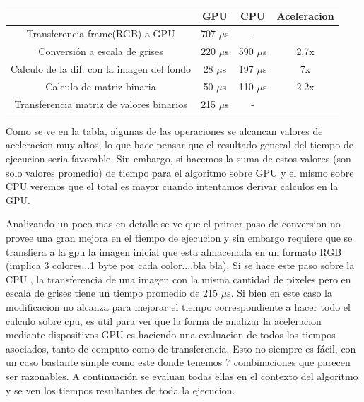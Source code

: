 \documentclass[a4paper,10pt]{report}
\begin{document}
\begin{center}
    \begin{tabular}{ c | c | c | c }
    \hline
    & GPU & CPU & Aceleracion\\ \hline
    Transferencia frame(RGB) a GPU & 707 $\mu$s &  - \\ \hline
    Conversión a escala de grises & 220 $\mu$s & 590 $\mu$s & 2.7x \\ \hline
    Calculo de la dif. con la imagen del fondo & 28 $\mu$s & 197 $\mu$s & 7x\\ \hline
    Calculo de matriz binaria & 50 $\mu$s & 110 $\mu$s & 2.2x\\ \hline
    Transferencia matriz de valores binarios & 215 $\mu$s & -  \\ \hline
    \end{tabular}
\end{center}


Como se ve en la tabla, algunas de las operaciones se alcancan valores de aceleracion muy altos, lo que hace pensar que el resultado general del tiempo de ejecucion seria favorable.
Sin embargo, si hacemos la suma de estos valores (son solo valores promedio) de tiempo para el algoritmo sobre GPU y el mismo sobre CPU veremos que el total es mayor cuando intentamos derivar calculos en la GPU.

Analizando un poco mas en detalle se ve que el primer paso de conversion no provee una gran mejora en el tiempo de ejecucion y sin embargo requiere que se transfiera a la gpu la imagen inicial
que esta almacenada en un formato RGB (implica 3 colores...1 byte por cada color....bla bla). Si se hace este paso sobre la CPU , la transferencia de una imagen con la misma cantidad de pixeles pero en escala de grises
tiene un tiempo promedio de 215 $\mu$s. Si bien en este caso la modificacion no alcanza para mejorar el tiempo correspondiente a hacer todo el calculo sobre cpu, 
es util para ver que la forma de analizar la aceleracion mediante dispositivos GPU es haciendo una evaluacion de todos los tiempos asociados, tanto de computo como de transferencia.
Esto no siempre es fácil, con un caso bastante simple como este donde tenemos 7 combinaciones que parecen ser razonables. A continuación se evaluan todas ellas en el contexto del algoritmo y
se ven los tiempos resultantes de toda la ejecucion.
\end{document}
